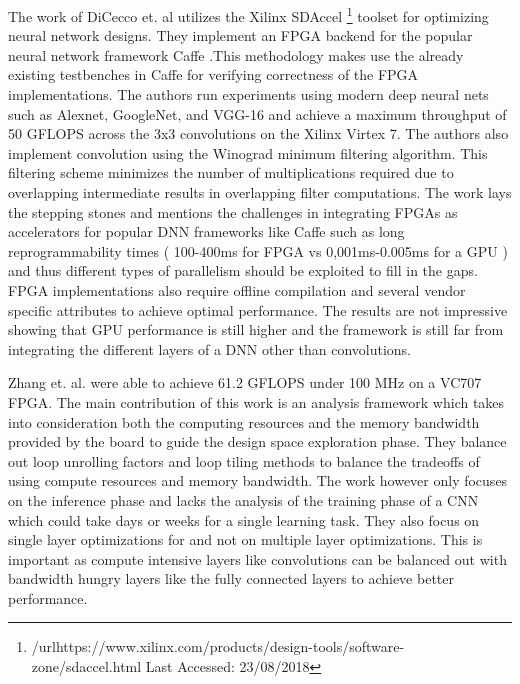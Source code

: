 The work of DiCecco et. al \cite{caffeinated} utilizes the Xilinx SDAccel \footnote{/url{https://www.xilinx.com/products/design-tools/software-zone/sdaccel.html} Last Accessed: 23/08/2018 } toolset for optimizing neural network designs. They implement an FPGA backend for the popular neural network framework Caffe \cite{caffe}.This methodology makes use the already existing testbenches in Caffe for verifying correctness of the FPGA implementations. The authors run experiments using modern deep neural nets such as Alexnet, GoogleNet, and VGG-16 and achieve a maximum throughput of 50 GFLOPS across the 3x3 convolutions on the Xilinx Virtex 7. The authors also implement convolution using the Winograd \cite{lavin2016fast} minimum filtering algorithm. This filtering scheme minimizes the number of multiplications required due to overlapping intermediate results in overlapping filter computations. The work lays the stepping stones and mentions the challenges in integrating FPGAs as accelerators for popular DNN frameworks like Caffe such as long reprogrammability times ( 100-400ms for FPGA vs 0,001ms-0.005ms for a GPU ) and thus different types of parallelism should be exploited to fill in the gaps. FPGA implementations also require offline compilation and several vendor specific attributes to achieve optimal performance. The results are not impressive showing that GPU performance is still higher and the framework is still far from integrating the different layers of a DNN other than convolutions.

Zhang et. al.\cite{Zhang:2015} were able to achieve 61.2 GFLOPS under 100 MHz on a VC707 FPGA. The main contribution of this work is an analysis framework which takes into consideration both the computing resources and the memory bandwidth provided by the board to guide the design space exploration phase. They balance out loop unrolling factors and loop tiling methods to balance the tradeoffs of using compute resources and memory bandwidth. The work however only focuses on the inference phase and lacks the analysis of the training phase of a CNN which could take days or weeks for a single learning task. They also focus on single layer optimizations for and not on multiple layer optimizations. This is important as compute intensive layers like convolutions can be balanced out with bandwidth hungry layers like the fully connected layers to achieve better performance. 




